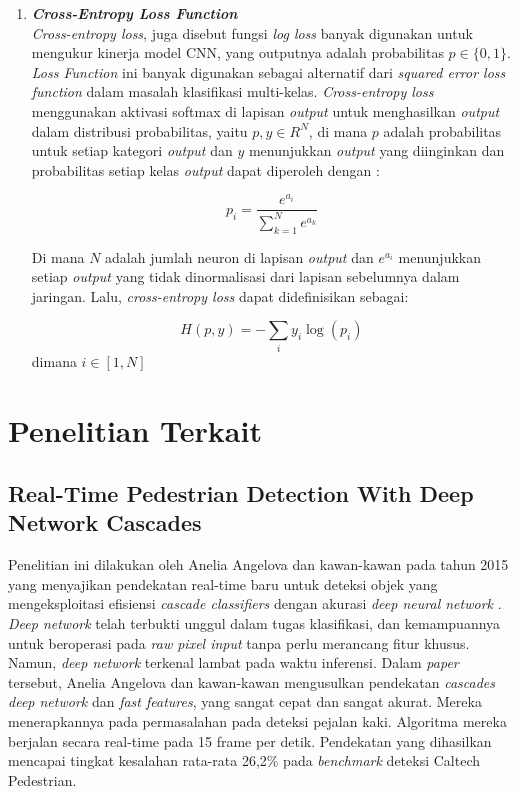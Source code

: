 \begin{enumerate}
	\item \textit{\textbf{Cross-Entropy Loss Function}}\\
	\textit{Cross-entropy loss}, juga disebut fungsi \textit{log loss} banyak digunakan untuk mengukur kinerja model CNN, yang outputnya adalah probabilitas $p \in \{0,1\}$. \textit{Loss Function} ini banyak digunakan sebagai alternatif dari \textit{squared error loss function} dalam masalah klasifikasi multi-kelas. \textit{Cross-entropy loss} menggunakan aktivasi softmax di lapisan \textit{output} untuk menghasilkan \textit{output} dalam distribusi probabilitas, yaitu $p, y \in R^N$, di mana $p$ adalah probabilitas untuk setiap kategori \textit{output} dan $y$ menunjukkan \textit{output} yang diinginkan dan probabilitas setiap kelas \textit{output} dapat diperoleh dengan : 
	
	\begin{equation}
		p_i = \frac{e^{a_i}}{\sum_{k=1}^{N} e^{a_k}}
	\end{equation}
	
	Di mana $N$ adalah jumlah neuron di lapisan \textit{output} dan $e^{a_i}$ menunjukkan setiap \textit{output} yang tidak dinormalisasi dari lapisan sebelumnya dalam jaringan. Lalu, \textit{cross-entropy loss} dapat didefinisikan sebagai:
	
	\begin{equation}
		H(p,y) =-\sum_{i} y_i\log(p_i)
	\end{equation}
	\centering
	dimana $i \in \left[1,N\right]$
	
\end{enumerate}

\section{Penelitian Terkait}
\label{penelitianterkait}

\subsection{Real-Time Pedestrian Detection With Deep Network Cascades}
\label{realtime pedestrian}

Penelitian ini dilakukan oleh Anelia Angelova dan kawan-kawan pada tahun 2015 yang menyajikan pendekatan real-time baru untuk deteksi objek yang mengeksploitasi efisiensi \textit{cascade classifiers} dengan akurasi \textit{deep neural network} \citep{penelitianterkait1}. \textit{Deep network} telah terbukti unggul dalam tugas klasifikasi, dan kemampuannya untuk beroperasi pada \textit{raw pixel input} tanpa perlu merancang fitur khusus. Namun, \textit{deep network} terkenal lambat pada waktu inferensi. Dalam \textit{paper} tersebut, Anelia Angelova dan kawan-kawan mengusulkan pendekatan \textit{cascades deep network} dan \textit{fast features}, yang sangat cepat dan sangat akurat. Mereka menerapkannya pada permasalahan pada deteksi pejalan kaki. Algoritma mereka berjalan secara real-time pada 15 frame per detik. Pendekatan yang dihasilkan mencapai tingkat kesalahan rata-rata 26,2\% pada \textit{benchmark} deteksi Caltech Pedestrian.